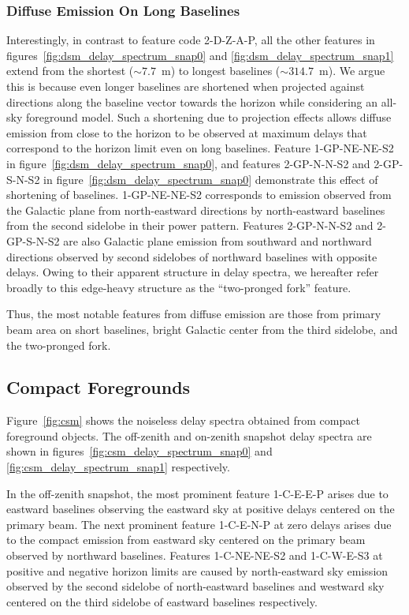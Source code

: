 \documentclass[preprint2,iop,numberedappendix]{emulateapj}
\begin{document}
\subsubsection{Diffuse Emission On Long Baselines }\label{sec:fork}

Interestingly, in contrast to feature code 2-D-Z-A-P, all the other features in figures~\ref{fig:dsm_delay_spectrum_snap0} and \ref{fig:dsm_delay_spectrum_snap1} extend from the shortest ($\sim 7.7$~m) to longest baselines ($\sim 314.7$~m). We argue this is because even longer baselines are shortened when projected against directions along the baseline vector towards the horizon while considering an all-sky foreground model. Such a shortening due to projection effects allows diffuse emission from close to the horizon to be observed at maximum delays that correspond to the horizon limit even on long baselines. Feature 1-GP-NE-NE-S2 in figure~\ref{fig:dsm_delay_spectrum_snap0}, and features 2-GP-N-N-S2 and 2-GP-S-N-S2 in figure~\ref{fig:dsm_delay_spectrum_snap0} demonstrate this effect of shortening of baselines. 1-GP-NE-NE-S2 corresponds to emission observed from the Galactic plane from north-eastward directions by north-eastward baselines from the second sidelobe in their power pattern. Features 2-GP-N-N-S2 and 2-GP-S-N-S2 are also Galactic plane emission from southward and northward directions observed by second sidelobes of northward baselines with opposite delays. Owing to their apparent structure in delay spectra, we hereafter refer broadly to this edge-heavy structure as the ``two-pronged fork'' feature. 

Thus, the most notable features from diffuse emission are those from primary beam area on short baselines, bright Galactic center from the third sidelobe, and the two-pronged fork.

\subsection{Compact Foregrounds}\label{sec:compact}

Figure~\ref{fig:csm} shows the noiseless delay spectra obtained from compact foreground objects. The off-zenith and on-zenith snapshot delay spectra are shown in figures~\ref{fig:csm_delay_spectrum_snap0} and \ref{fig:csm_delay_spectrum_snap1} respectively. 

In the off-zenith snapshot, the most prominent feature 1-C-E-E-P arises due to eastward baselines observing the eastward sky at positive delays centered on the primary beam. The next prominent feature 1-C-E-N-P at zero delays arises due to the compact emission from eastward sky centered on the primary beam observed by northward baselines. Features 1-C-NE-NE-S2 and 1-C-W-E-S3 at positive and negative horizon limits are caused by north-eastward sky emission observed by the second sidelobe of north-eastward baselines and westward sky centered on the third sidelobe of eastward baselines respectively. 
\end{document}
